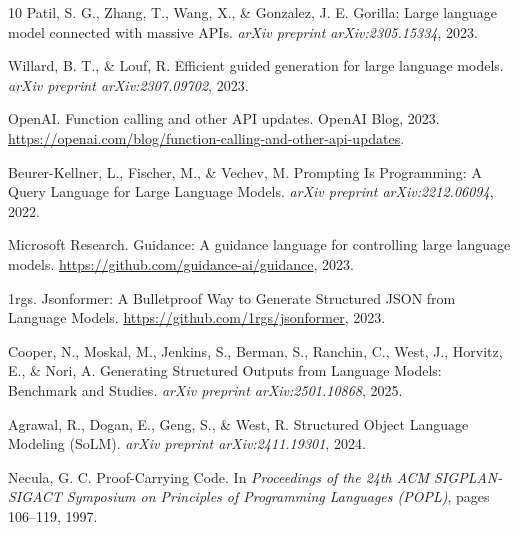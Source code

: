 \documentclass[11pt,a4paper]{article}
\begin{document}
\begin{thebibliography}{10}
Patil, S. G., Zhang, T., Wang, X., \& Gonzalez, J. E.
\newblock Gorilla: Large language model connected with massive APIs.
\newblock \textit{arXiv preprint arXiv:2305.15334}, 2023.


Willard, B. T., \& Louf, R.
\newblock Efficient guided generation for large language models.
\newblock \textit{arXiv preprint arXiv:2307.09702}, 2023.

OpenAI.
\newblock Function calling and other API updates.
\newblock OpenAI Blog, 2023.
\newblock \url{https://openai.com/blog/function-calling-and-other-api-updates}.


Beurer-Kellner, L., Fischer, M., \& Vechev, M.
\newblock Prompting Is Programming: A Query Language for Large Language Models.
\newblock \textit{arXiv preprint arXiv:2212.06094}, 2022.

Microsoft Research.
\newblock Guidance: A guidance language for controlling large language models.
\newblock \url{https://github.com/guidance-ai/guidance}, 2023.

1rgs.
\newblock Jsonformer: A Bulletproof Way to Generate Structured JSON from Language Models.
\newblock \url{https://github.com/1rgs/jsonformer}, 2023.

Cooper, N., Moskal, M., Jenkins, S., Berman, S., Ranchin, C., West, J., Horvitz, E., \& Nori, A.
\newblock Generating Structured Outputs from Language Models: Benchmark and Studies.
\newblock \textit{arXiv preprint arXiv:2501.10868}, 2025.

Agrawal, R., Dogan, E., Geng, S., \& West, R.
\newblock Structured Object Language Modeling (SoLM).
\newblock \textit{arXiv preprint arXiv:2411.19301}, 2024.


Necula, G. C.
\newblock Proof-Carrying Code.
\newblock In \textit{Proceedings of the 24th ACM SIGPLAN-SIGACT Symposium on Principles of Programming Languages (POPL)}, pages 106--119, 1997.


\end{thebibliography}
\end{document}
